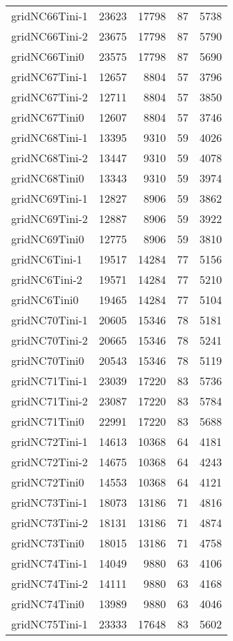 \begin{tabular}{lrrrr}
gridNC66Tini-1 & 23623 & 17798 & 87 & 5738 \\
gridNC66Tini-2 & 23675 & 17798 & 87 & 5790 \\
gridNC66Tini0 & 23575 & 17798 & 87 & 5690 \\
gridNC67Tini-1 & 12657 & 8804 & 57 & 3796 \\
gridNC67Tini-2 & 12711 & 8804 & 57 & 3850 \\
gridNC67Tini0 & 12607 & 8804 & 57 & 3746 \\
gridNC68Tini-1 & 13395 & 9310 & 59 & 4026 \\
gridNC68Tini-2 & 13447 & 9310 & 59 & 4078 \\
gridNC68Tini0 & 13343 & 9310 & 59 & 3974 \\
gridNC69Tini-1 & 12827 & 8906 & 59 & 3862 \\
gridNC69Tini-2 & 12887 & 8906 & 59 & 3922 \\
gridNC69Tini0 & 12775 & 8906 & 59 & 3810 \\
gridNC6Tini-1 & 19517 & 14284 & 77 & 5156 \\
gridNC6Tini-2 & 19571 & 14284 & 77 & 5210 \\
gridNC6Tini0 & 19465 & 14284 & 77 & 5104 \\
gridNC70Tini-1 & 20605 & 15346 & 78 & 5181 \\
gridNC70Tini-2 & 20665 & 15346 & 78 & 5241 \\
gridNC70Tini0 & 20543 & 15346 & 78 & 5119 \\
gridNC71Tini-1 & 23039 & 17220 & 83 & 5736 \\
gridNC71Tini-2 & 23087 & 17220 & 83 & 5784 \\
gridNC71Tini0 & 22991 & 17220 & 83 & 5688 \\
gridNC72Tini-1 & 14613 & 10368 & 64 & 4181 \\
gridNC72Tini-2 & 14675 & 10368 & 64 & 4243 \\
gridNC72Tini0 & 14553 & 10368 & 64 & 4121 \\
gridNC73Tini-1 & 18073 & 13186 & 71 & 4816 \\
gridNC73Tini-2 & 18131 & 13186 & 71 & 4874 \\
gridNC73Tini0 & 18015 & 13186 & 71 & 4758 \\
gridNC74Tini-1 & 14049 & 9880 & 63 & 4106 \\
gridNC74Tini-2 & 14111 & 9880 & 63 & 4168 \\
gridNC74Tini0 & 13989 & 9880 & 63 & 4046 \\
gridNC75Tini-1 & 23333 & 17648 & 83 & 5602 \\

\end{tabular}
